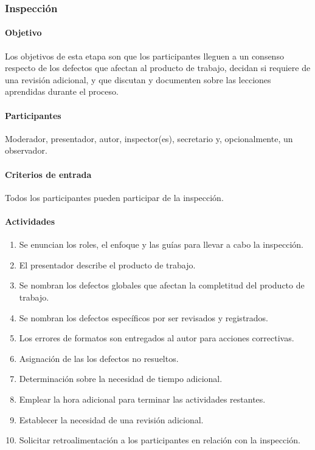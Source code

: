 \subsubsection{Inspección}

\paragraph{Objetivo\\}

Los objetivos de esta etapa son que los participantes lleguen a un consenso respecto de los defectos que afectan al producto de trabajo, decidan si requiere de una revisión adicional, y que discutan y documenten sobre las lecciones aprendidas durante el proceso.

\paragraph{Participantes\\}

Moderador, presentador, autor, inspector(es), secretario y, opcionalmente, un observador.

\paragraph{Criterios de entrada\\}

Todos los participantes pueden participar de la inspección.

\paragraph{Actividades}

\begin{enumerate}
	\item
		Se enuncian los roles, el enfoque y las guías para llevar a cabo la inspección.
	\item
		El presentador describe el producto de trabajo.
	\item		
		Se nombran los defectos globales que afectan la completitud del producto de trabajo.
	\item		
		Se nombran los defectos específicos por ser revisados y registrados.
	\item		
		Los errores de formatos son entregados al autor para acciones correctivas.
	\item
		Asignación de las los defectos no resueltos.
	\item 
		Determinación sobre la necesidad de tiempo adicional. 
	\item
		Emplear la hora adicional para terminar las actividades restantes.
	\item
		Establecer la necesidad de una revisión adicional.
	\item
		Solicitar retroalimentación a los participantes en relación con la inspección.
\end{enumerate}

